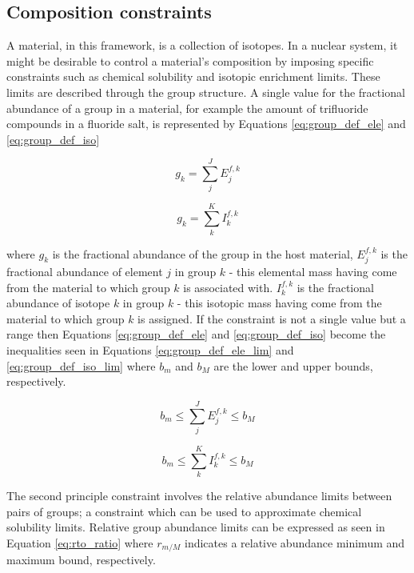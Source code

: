 \subsection{Composition constraints} \label{ssec:group_eq}
A material, in this framework, is a collection of isotopes. In a nuclear 
system, it might be desirable to control a material's  composition by imposing 
specific constraints such as chemical solubility and isotopic enrichment limits.
These limits are described through the group structure. A single value for 
the fractional abundance of a group in
a material, for example the amount of trifluoride compounds in a fluoride 
salt, is represented by Equations
\ref{eq:group_def_ele} and \ref{eq:group_def_iso}

\begin{equation}
\label{eq:group_def_ele}
g_{k} = \sum \limits_{j}^{J} E_{j}^{f,k}
\end{equation} 

\begin{equation}
\label{eq:group_def_iso}
g_{k} = \sum \limits_{k}^{K} I_{k}^{f,k}
\end{equation}

where $g_{k}$ is the fractional abundance of the 
group in the host material, $E_{j}^{f,k}$ is the fractional abundance of element
$j$ in group $k$ - this elemental mass having come from the material to which
group $k$ is associated with.
$I_{k}^{f,k}$ is the fractional 
abundance of isotope $k$ in group $k$ - this isotopic mass having come from
the material to which group $k$ is assigned.
If the constraint is not a single value but a range then 
Equations \ref{eq:group_def_ele} and \ref{eq:group_def_iso} become the 
inequalities seen
in Equations \ref{eq:group_def_ele_lim} and \ref{eq:group_def_iso_lim} where
$b_{m}$ and $b_{M}$ are the lower and upper bounds, respectively.

\begin{equation}
\label{eq:group_def_ele_lim}
b_m \leq \sum \limits_{j}^{J} E_{j}^{f,k} \leq b_{M}
\end{equation} 

\begin{equation}
\label{eq:group_def_iso_lim}
b_{m} \leq \sum \limits_{k}^{K} I_{k}^{f,k} \leq b_{M} 
\end{equation}

The second principle constraint involves the relative abundance limits between 
pairs of groups; a constraint which can be used to approximate chemical 
solubility limits. Relative group abundance limits can be expressed as seen in 
Equation \ref{eq:rto_ratio} where $r_{m/M}$ indicates a relative abundance 
minimum and maximum bound, respectively.

